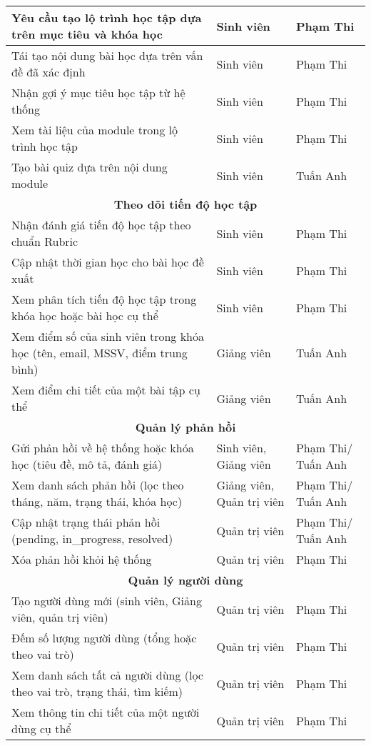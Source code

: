 \begin{longtable}{|p{8cm}|p{3cm}|p{2cm}|}
Yêu cầu tạo lộ trình học tập dựa trên mục tiêu và khóa học & Sinh viên &  Phạm Thi\\ \hline
Tái tạo nội dung bài học dựa trên vấn đề đã xác định & Sinh viên &  Phạm Thi\\ \hline
Nhận gợi ý mục tiêu học tập từ hệ thống & Sinh viên &  Phạm Thi\\ \hline
Xem tài liệu của module trong lộ trình học tập & Sinh viên &  Phạm Thi\\ \hline
Tạo bài quiz dựa trên nội dung module & Sinh viên & Tuấn Anh\\ \hline
\multicolumn{3}{|c|}{\textbf{Theo dõi tiến độ học tập}} \\ \hline
Nhận đánh giá tiến độ học tập theo chuẩn Rubric & Sinh viên & Phạm Thi\\ \hline
Cập nhật thời gian học cho bài học đề xuất & Sinh viên & Phạm Thi\\ \hline
Xem phân tích tiến độ học tập trong khóa học hoặc bài học cụ thể & Sinh viên & Phạm Thi\\ \hline
Xem điểm số của sinh viên trong khóa học (tên, email, MSSV, điểm trung bình) & Giảng viên &  Tuấn Anh\\ \hline
Xem điểm chi tiết của một bài tập cụ thể & Giảng viên &  Tuấn Anh\\ \hline
\multicolumn{3}{|c|}{\textbf{Quản lý phản hồi}} \\ \hline
Gửi phản hồi về hệ thống hoặc khóa học (tiêu đề, mô tả, đánh giá) & Sinh viên, Giảng viên & Phạm Thi/ Tuấn Anh\\ \hline
Xem danh sách phản hồi (lọc theo tháng, năm, trạng thái, khóa học) & Giảng viên, Quản trị viên & Phạm Thi/ Tuấn Anh\\ \hline
Cập nhật trạng thái phản hồi (pending, in\_progress, resolved) & Quản trị viên & Phạm Thi/ Tuấn Anh\\ \hline
Xóa phản hồi khỏi hệ thống & Quản trị viên & Phạm Thi\\ \hline
\multicolumn{3}{|c|}{\textbf{Quản lý người dùng}} \\ \hline
Tạo người dùng mới (sinh viên, Giảng viên, quản trị viên) & Quản trị viên & Phạm Thi\\ \hline
Đếm số lượng người dùng (tổng hoặc theo vai trò) & Quản trị viên & Phạm Thi\\ \hline
Xem danh sách tất cả người dùng (lọc theo vai trò, trạng thái, tìm kiếm) & Quản trị viên & Phạm Thi\\ \hline
Xem thông tin chi tiết của một người dùng cụ thể & Quản trị viên & Phạm Thi\\ \hline

\end{longtable}
